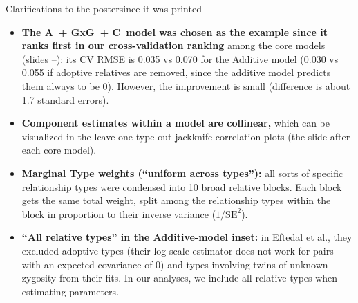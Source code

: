 \documentclass[aspectratio=169, 10pt]{beamer}
\newcommand{\mA}{\textcolor{cAddText}{\textbf{A}}}
\newcommand{\mG}{\textcolor{cGxGText}{\textbf{GxG}}}
\newcommand{\mC}{\textcolor{cFamText}{\textbf{C}}}
\begin{document}
\begin{frame}{Clarifications to the poster}{since it was printed}
  \small\vspace{-0.2em}
  \begin{itemize}\setlength{\itemsep}{0.4em}
    \item \textbf{The \mA\ + \mG\ + \mC\ model was chosen as the example since it ranks first in our cross-validation ranking} among the core models (slides
          \pageref{cv}--\pageref{cv-by-type}): 
          its CV RMSE is 0.035 vs 0.070 for the Additive model (0.030 vs 0.055 if adoptive relatives are removed, since the additive model predicts them always to be 0).
          However, the improvement is small (difference is about 1.7 standard errors).
    \item \textbf{Component estimates within a model are collinear,} which can be visualized in the leave-one-type-out jackknife correlation plots (the slide after each core model).
    \item \textbf{Marginal Type weights (``uniform across types''):} all sorts of specific relationship types were condensed into 10 broad relative blocks. Each block gets the same total weight, split among the relationship types within the block in proportion to their inverse variance ($1/\mathrm{SE}^2$).
    \item \textbf{``All relative types'' in the Additive-model inset:} in Eftedal et al., they excluded adoptive types (their log-scale estimator does not work for pairs with an expected covariance of 0) and types involving twins of unknown zygosity from their fits.
    In our analyses, we include all relative types when estimating parameters.
  \end{itemize}
\end{frame}
\end{document}
